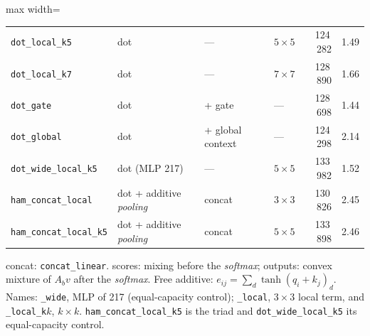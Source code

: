 \begin{table}[!t]
\begin{adjustbox}{max width=\linewidth}
\begin{tabular}{llllrr}
\texttt{dot\_local\_k5} & dot & --- & $5\times5$ & 124\,282 & 1.49 \\
\texttt{dot\_local\_k7} & dot & --- & $7\times7$ & 128\,890 & 1.66 \\
\texttt{dot\_gate} & dot & + gate & --- & 128\,698 & 1.44 \\
\texttt{dot\_global} & dot & + global context & --- & 124\,298 & 2.14 \\
\texttt{dot\_wide\_local\_k5} & dot (MLP 217) & --- & $5\times5$ & 133\,982 & 1.52 \\
\texttt{ham\_concat\_local} & dot + additive \emph{pooling} & concat & $3\times3$ & 130\,826 & 2.45 \\
\texttt{ham\_concat\_local\_k5} & dot + additive \emph{pooling} & concat & $5\times5$ & 133\,898 & 2.46 \\
\bottomrule
\end{tabular}
\end{adjustbox}
\par\smallskip\parbox{\linewidth}{\footnotesize concat: \texttt{concat\_linear}. scores: mixing before the \emph{softmax}; outputs: convex mixture of $A_b v$ after the \emph{softmax}. Free additive: $e_{ij}=\sum_d \tanh(q_i+k_j)_d$. Names: \texttt{\_wide}, MLP of 217 (equal-capacity control); \texttt{\_local}, $3\times3$ local term, and \texttt{\_local\_k}$k$, $k\times k$. \texttt{ham\_concat\_local\_k5} is the triad and \texttt{dot\_wide\_local\_k5} its equal-capacity control.}
\end{table}
